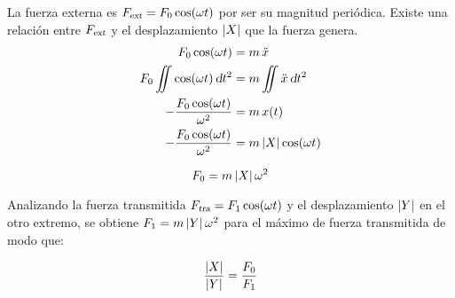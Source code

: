 La fuerza externa es ${{F}_\textsl{{ext}}}=F_0 \cos (\omega t)$ por ser su magnitud periódica.
Existe una relación entre ${{F}_\textsl{{ext}}}$ y el desplazamiento ${\left| {X} \right|}$ que la fuerza genera.
\begin{align*}
    F_0 \cos (\omega t) &= m \, \ddot{x}
    \\
    F_0 \iint \cos (\omega t) \, \textsl{d} t^2 &= m \iint \ddot{x} \, \textsl{d} t^2
    \\
    -\frac{F_0 \cos (\omega t)}{\omega^2} &= m \, x(t)
    \\
    -\frac{F_0 \cos (\omega t)}{\omega^2} &= m \, {\left| {X} \right|} \cos (\omega t)
\end{align*}

\begin{mdframed}[style=PropertyFrame]
    \begin{prop}
    \end{prop}
    \begin{equation*}
        F_0 = m \, {\left| {X} \right|} \, \omega^2
    \end{equation*}
\end{mdframed}

Analizando la fuerza transmitida ${{F}_\textsl{{tra}}}=F_1 \cos(\omega t)$ y el desplazamiento ${\left| {Y} \right|}$ en el otro extremo, se obtiene $F_1 = m \, {\left| {Y} \right|} \, \omega^2$ para el máximo de fuerza transmitida de modo que:

\begin{mdframed}[style=PropertyFrame]
    \begin{prop}
    \end{prop}
    \begin{equation*}
        \frac{{\left| {X} \right|}}{{\left| {Y} \right|}}=\frac{F_0}{F_1}
    \end{equation*}
\end{mdframed}